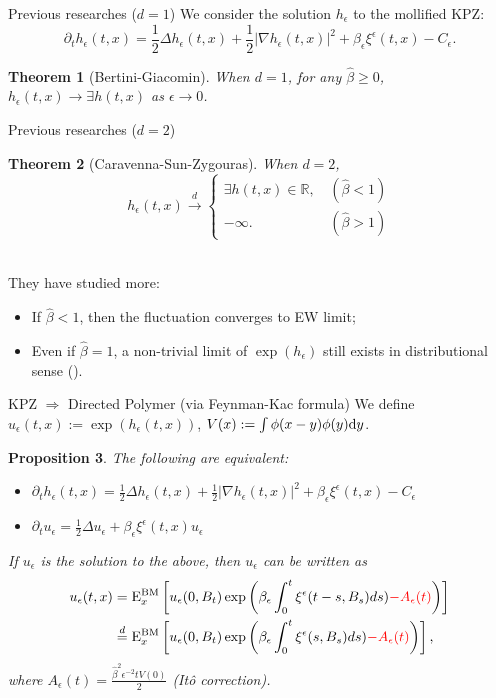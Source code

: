 \documentclass[10pt]{beamer}
\newtheorem{thm}{Theorem}
\newtheorem{prop}[thm]{Proposition}
\newcommand{\R}{\mathbb{R}}
\newcommand{\e}{\epsilon}
\def\al#1{\begin{align*}#1\end{align*}}
\begin{document}
\begin{frame}{Previous researches ($d=1$)}
  We consider the solution $h_{\epsilon}$ to the mollified KPZ:
  $$\partial_t h_{\e}(t,x)=\frac{1}{2}\Delta h_{\e}(t,x)+\frac{1}{2}\left|\nabla h_{\e}(t,x)\right|^2+\beta_{\e} \xi^{\e}(t,x)-C_{\e}.$$
  \begin{thm}[Bertini-Giacomin]
    When $d=1$, for any $\hat{\beta}\geq 0$, $h_{\epsilon}(t,x)\to \exists h(t,x)$ as $\e\to 0$.
  \end{thm}
\end{frame}
\begin{frame}{Previous researches ($d=2$)}
  \begin{thm}[Caravenna-Sun-Zygouras]
     When $d=2$,
     $$h_{\epsilon}(t,x)\overset{d}{\to}
     \begin{cases}
       \exists h(t,x)\in\R,\,&\text{$(\hat{\beta}<1)$}\\
       -\infty.\,&\text{$(\hat{\beta}> 1)$}
     \end{cases}
     $$
    \end{thm}
      ~\\
    They have studied more:
    \begin{itemize}
        \item If $\hat{\beta}<1$, then the fluctuation converges to EW limit;
        \item Even if $\hat{\beta}=1$, a non-trivial limit of $\exp{(h_\e)}$ still exists in distributional sense ({\color{red}{Critical Stochastic Heat Flow}}). 
    \end{itemize}
    
    \end{frame}
\begin{frame}{{\rm KPZ} $\Rightarrow$ Directed Polymer (via Feynman-Kac formula)}
 We define $u_{\epsilon}(t,x):=\exp{(h_{\epsilon}(t,x))}$, $V(x):= \int \phi(x-y)\phi(y) {\rm d} y$.
  \begin{prop}
      The following are equivalent:
     \begin{itemize}
         \item $\partial_t h_{\e}(t,x)=\frac{1}{2}\Delta h_{\e}(t,x)+\frac{1}{2}\left|\nabla h_{\e}(t,x)\right|^2+\beta_{\e} \xi^{\e}(t,x)-C_{\e}$ \item $\partial_t u_{\epsilon}=\frac{1}{2}\Delta u_{\epsilon} +\beta_{\epsilon} \xi^{\e} (t,x)u_{\epsilon}$
     \end{itemize}  
    If $u_\e$ is the solution to the above, then $u_{\epsilon}$ can be written as
    \vspace{-1mm}
    \al{
    u_{\epsilon}(t,x)&= {\rm E}_{x}^{\rm BM}\left[u_{\epsilon}(0,B_t)\exp{\left(\beta_{\epsilon}\int_{0}^t \xi^{\e}  (t-s,B_s)ds){\color{red}-A_{\epsilon}(t)}\right)}\right]\\
       &\overset{d}{=}{\rm E}_{x}^{\rm BM}\left[u_{\epsilon}(0,B_t)\exp{\left(\beta_{\epsilon}\int_{0}^t \xi^{\e} (s,B_s)ds){\color{red}-A_{\epsilon}(t)}\right)}\right],
    }
    where $A_{\epsilon}(t)=\frac{\hat{\beta}^2 \e^{-2} t V(0)}{2}$ {\color{blue}(It\^o correction)}.
  \end{prop}
\end{frame}
\end{document}
